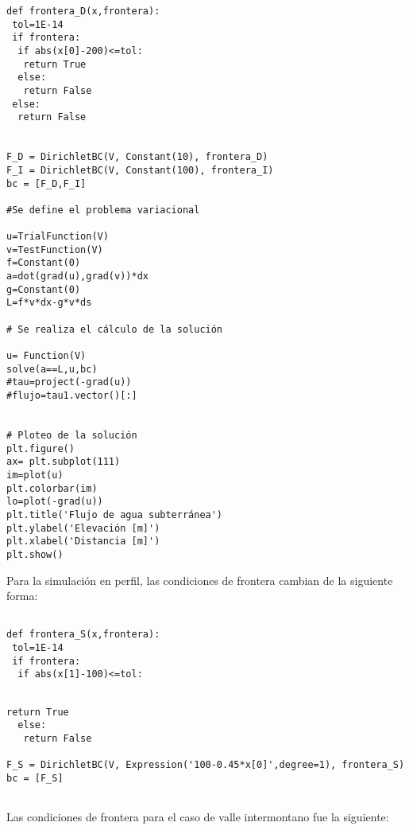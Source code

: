 \begin{lstlisting}[frame=single]
def frontera_D(x,frontera):
 tol=1E-14    
 if frontera:
  if abs(x[0]-200)<=tol: 
   return True
  else:
   return False 
 else:
  return False  


F_D = DirichletBC(V, Constant(10), frontera_D)
F_I = DirichletBC(V, Constant(100), frontera_I)
bc = [F_D,F_I]

#Se define el problema variacional

u=TrialFunction(V)
v=TestFunction(V)
f=Constant(0)
a=dot(grad(u),grad(v))*dx
g=Constant(0)
L=f*v*dx-g*v*ds

# Se realiza el cálculo de la solución

u= Function(V)
solve(a==L,u,bc)
#tau=project(-grad(u))
#flujo=tau1.vector()[:] 


# Ploteo de la solución
plt.figure()
ax= plt.subplot(111)  
im=plot(u)
plt.colorbar(im) 
lo=plot(-grad(u))
plt.title('Flujo de agua subterránea')
plt.ylabel('Elevación [m]')
plt.xlabel('Distancia [m]')
plt.show()

\end{lstlisting}



Para la simulación en perfil, las condiciones de frontera cambian de la siguiente forma:

\lstset{language=python,breaklines=true, basicstyle=\footnotesize}
\begin{lstlisting}[frame=single]

def frontera_S(x,frontera):
 tol=1E-14    
 if frontera:
  if abs(x[1]-100)<=tol: 


\end{lstlisting}   
\begin{lstlisting}[frame=single]   
   return True
  else:
   return False
   
F_S = DirichletBC(V, Expression('100-0.45*x[0]',degree=1), frontera_S)
bc = [F_S]


\end{lstlisting}

Las condiciones de frontera para el caso de valle intermontano fue la siguiente:

